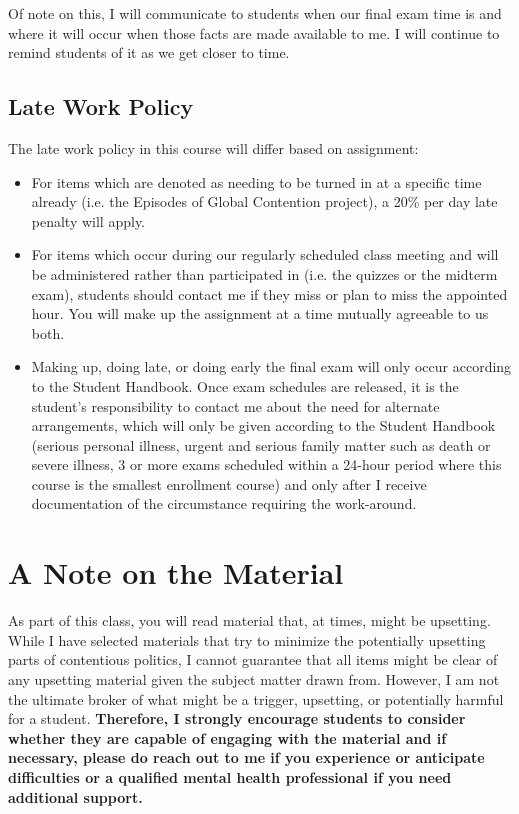 \documentclass[12pt]{article}
\begin{document}
\par{Of note on this, I will communicate to students when our final exam time is and where it will occur when those facts are made available to me. I will continue to remind students of it as we get closer to time.}

\subsection*{Late Work Policy}
\par{The late work policy in this course will differ based on assignment:
\begin{itemize}
    \item For items which are denoted as needing to be turned in at a specific time already (i.e. the Episodes of Global Contention project), a 20\% per day late penalty will apply.
    \item For items which occur during our regularly scheduled class meeting and will be administered rather than participated in (i.e. the quizzes or the midterm exam), students should contact me if they miss or plan to miss the appointed hour. You will make up the assignment at a time mutually agreeable to us both. 
    \item Making up, doing late, or doing early the final exam will only occur according to the Student Handbook. Once exam schedules are released, it is the student's responsibility to contact me about the need for alternate arrangements, which will only be given according to the Student Handbook (serious personal illness, urgent and serious family matter such as death or severe illness, 3 or more exams scheduled within a 24-hour period where this course is the smallest enrollment course) and only after I receive documentation of the circumstance requiring the work-around.
\end{itemize}}

\section*{A Note on the Material}
\par{As part of this class, you will read material that, at times, might be upsetting. While I have selected materials that try to minimize the potentially upsetting parts of contentious politics, I cannot guarantee that all items might be clear of any upsetting material given the subject matter drawn from. However, I am not the ultimate broker of what might be a trigger, upsetting, or potentially harmful for a student. \textbf{Therefore, I strongly encourage students to consider whether they are capable of engaging with the material and if necessary, please do reach out to me if you experience or anticipate difficulties or a qualified mental health professional if you need additional support.}}
\end{document}
